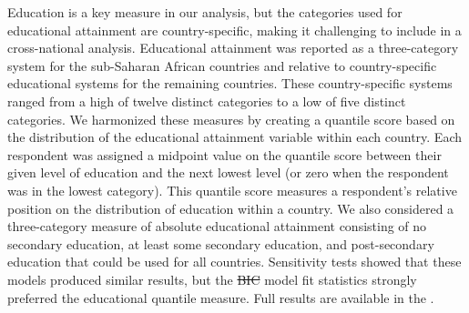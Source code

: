 \documentclass[10pt,letterpaper]{article}
\providecommand{\DIFaddtex}[1]{{\protect\color{blue}\uwave{#1}}} %
\providecommand{\DIFdeltex}[1]{{\protect\color{red}\sout{#1}}}                      %
\providecommand{\DIFaddbegin}{} %
\providecommand{\DIFaddend}{} %
\providecommand{\DIFdelbegin}{} %
\providecommand{\DIFdelend}{} %
\providecommand{\DIFadd}[1]{\texorpdfstring{\DIFaddtex{#1}}{#1}} %
\providecommand{\DIFdel}[1]{\texorpdfstring{\DIFdeltex{#1}}{}} %
\newcommand{\DIFscaledelfig}{0.5}
\newlength{\DIFdelgraphicswidth} %
\newlength{\DIFdelgraphicsheight} %
\newcommand{\DIFaddincludegraphics}[2][]{{\color{blue}\fbox{\DIFOincludegraphics[#1]{#2}}}} %
\newcommand{\DIFdelincludegraphics}[2][]{%
\sbox{\DIFdelgraphicsbox}{\DIFOincludegraphics[#1]{#2}}%
\settoboxwidth{\DIFdelgraphicswidth}{\DIFdelgraphicsbox} %
\settoboxtotalheight{\DIFdelgraphicsheight}{\DIFdelgraphicsbox} %
\scalebox{\DIFscaledelfig}{%
\parbox[b]{\DIFdelgraphicswidth}{\usebox{\DIFdelgraphicsbox}\\[-\baselineskip] \rule{\DIFdelgraphicswidth}{0em}}\llap{\resizebox{\DIFdelgraphicswidth}{\DIFdelgraphicsheight}{%
\setlength{\unitlength}{\DIFdelgraphicswidth}%
\begin{picture}(1,1)%
\thicklines\linethickness{2pt} %
{\color[rgb]{1,0,0}\put(0,0){\framebox(1,1){}}}%
{\color[rgb]{1,0,0}\put(0,0){\line( 1,1){1}}}%
{\color[rgb]{1,0,0}\put(0,1){\line(1,-1){1}}}%
\end{picture}%
}\hspace*{3pt}}} %
} %
\DeclareRobustCommand{\DIFaddbegin}{\DIFOaddbegin \let\includegraphics\DIFaddincludegraphics} %
\DeclareRobustCommand{\DIFaddend}{\DIFOaddend \let\includegraphics\DIFOincludegraphics} %
\DeclareRobustCommand{\DIFdelbegin}{\DIFOdelbegin \let\includegraphics\DIFdelincludegraphics} %
\DeclareRobustCommand{\DIFdelend}{\DIFOaddend \let\includegraphics\DIFOincludegraphics} %
\begin{document}
Education is a key measure in our analysis, but the categories used for educational attainment are country-specific, making it challenging to include in a cross-national analysis. Educational attainment was reported as a three-category system for the sub-Saharan African countries and relative to country-specific educational systems for the remaining countries. These country-specific systems ranged from a high of twelve distinct categories to a low of five distinct categories. We harmonized these measures by creating a quantile score based on the distribution of the educational attainment variable within each country. Each respondent was assigned a midpoint value on the quantile score between their given level of education and the next lowest level (or zero when the respondent was in the lowest category). This quantile score measures a respondent's relative position on the distribution of education within a country. We also considered a three-category measure of absolute educational attainment consisting of no secondary education, at least some secondary education, and post-secondary education that could be used for all countries. Sensitivity tests showed that these models produced similar results, but the \DIFdelbegin \DIFdel{BIC }\DIFdelend model fit statistics strongly preferred the educational quantile measure. Full results are available in the \DIFdelbegin %
\DIFdelend \DIFaddbegin \DIFadd{supplementary materials}\DIFaddend .
\end{document}
